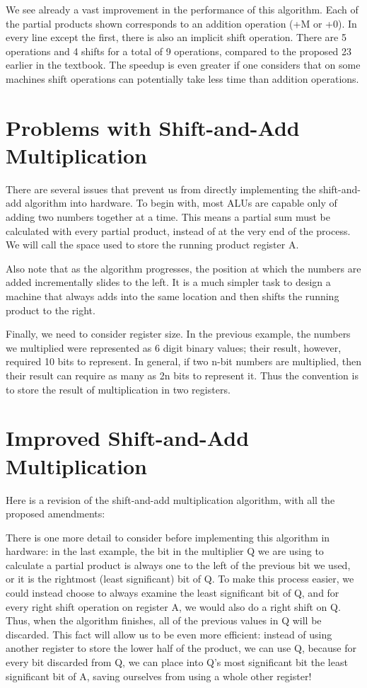 \documentclass{article}
\begin{document}
We see already a vast improvement in the performance of this algorithm. Each of the partial products shown corresponds to an addition operation (+M or +0). In every line except the first, there is also an implicit shift operation. There are 5 operations and 4 shifts for a total of 9 operations, compared to the proposed 23 earlier in the textbook. The speedup is even greater if one considers that on some machines shift operations can potentially take less time than addition operations.

\section{Problems with Shift-and-Add Multiplication}
There are several issues that prevent us from directly implementing the shift-and-add algorithm into hardware. To begin with, most ALUs are capable only of adding two numbers together at a time. This means a partial sum must be calculated with every partial product, instead of at the very end of the process. We will call the space used to store the running product register A.

Also note that as the algorithm progresses, the position at which the numbers are added incrementally slides to the left. It is a much simpler task to design a machine that always adds into the same location and then shifts the running product to the right.

Finally, we need to consider register size. In the previous example, the numbers we multiplied were represented as 6 digit binary values; their result, however, required 10 bits to represent. In general, if two n-bit numbers are multiplied, then their result can require as many as 2n bits to represent it. Thus the convention is to store the result of multiplication in two registers.

\section{Improved Shift-and-Add Multiplication}
Here is a revision of the shift-and-add multiplication algorithm, with all the proposed amendments: %

There is one more detail to consider before implementing this algorithm in hardware: in the last example, the bit in the multiplier Q we are using to calculate a partial product is always one to the left of the previous bit we used, or it is the rightmost (least significant) bit of Q. To make this process easier, we could instead choose to always examine the least significant bit of Q, and for every right shift operation on register A, we would also do a right shift on Q. Thus, when the algorithm finishes, all of the previous values in Q will be discarded. This fact will allow us to be even more efficient: instead of using another register to store the lower half of the product, we can use Q, because for every bit discarded from Q, we can place into Q's most significant bit the least significant bit of A, saving ourselves from using a whole other register!
\end{document}
